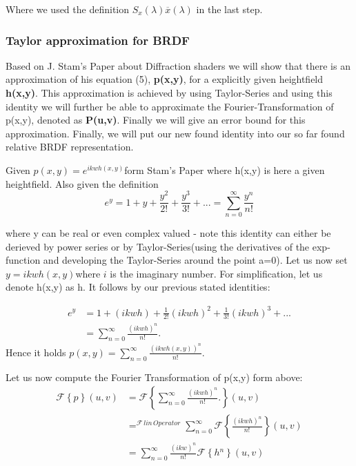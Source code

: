 Where we used the definition $S_x(\lambda)\overline{x}(\lambda)$ in the last step.

\subsubsection{Taylor approximation for BRDF}
Based on J. Stam's Paper about Diffraction shaders we will show that
there is an approximation of his equation (5), \textbf{p(x,y)}, for
a explicitly given heightfield \textbf{h(x,y)}. This approximation
is achieved by using Taylor-Series and using this identity we will
further be able to approximate the Fourier-Transformation of p(x,y),
denoted as \textbf{P(u,v)}. Finally we will give an error bound for
this approximation. Finally, we will put our new found identity into our so far found relative BRDF representation.

Given $p(x,y)=e^{ikwh(x,y)}$form Stam's Paper where h(x,y) is here
a given heightfield. Also given the definition
\begin{equation*}
  e^{y}=1+y+\frac{y^{2}}{2!}+\frac{y^{3}}{3!}+...=\sum_{n=0}^{\infty}\frac{y^{n}}{n!}
\end{equation*}

where y can be real or even complex valued - note this identity can either
be derieved by power series or by Taylor-Series(using the derivatives
of the exp-function and developing the Taylor-Series around the point
a=0). Let us now set $y=ikwh(x,y)$where $i$ is the imaginary number.
For simplification, let us denote h(x,y) as h. It follows by our previous
stated identities: 

\begin{align*}
 e^{y}
 &=1+(ikwh)+\frac{1}{2!}(ikwh)^{2}+\frac{1}{3!}(ikwh)^{3}+... \\
 &=\sum_{n=0}^{\infty}\frac{(ikwh)^{n}}{n!}.
\end{align*}
Hence it holds $p(x,y)=\sum_{n=0}^{\infty}\frac{(ikwh(x,y))^{n}}{n!}.$

Let us now compute the Fourier Transformation of p(x,y) form above:
\begin{align*}
  \mathcal{F}\left\{ p\right\} (u,v)
  & =\mathcal{F}\left\{ \sum_{n=0}^{\infty}\frac{(ikwh)^{n}}{n!}.\right\}(u,v) \\
  & =^{\mathcal{F}\, lin\, Operator}\sum_{n=0}^{\infty}\mathcal{F}\left\{ \frac{(ikwh)^{n}}{n!}\right\}(u,v) \\
  & =\sum_{n=0}^{\infty}\frac{(ikw)^{n}}{n!}\mathcal{F}\left\{ h{}^{n}\right\}(u,v)
\end{align*}

